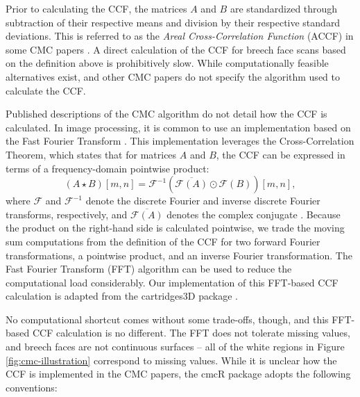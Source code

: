 \documentclass[11pt,]{isuthesis}
\begin{document}
Prior to calculating the CCF, the matrices \(A\) and \(B\) are standardized through subtraction of their respective means and division by their respective standard deviations.
This is referred to as the \emph{Areal Cross-Correlation Function} (ACCF) in some CMC papers \citep{ott_applying_2017}.
A direct calculation of the CCF for breech face scans based on the definition above is prohibitively slow.
While computationally feasible alternatives exist, \citet{song_proposed_2013} and other CMC papers do not specify the algorithm used to calculate the CCF.

Published descriptions of the CMC algorithm do not detail how the CCF is calculated.
In image processing, it is common to use an implementation based on the Fast Fourier Transform \citep{Brown1992}.
This implementation leverages the Cross-Correlation Theorem, which states that for matrices \(A\) and \(B\), the CCF can be expressed in terms of a frequency-domain pointwise product:
\[
(A \star B )[m,n]= \mathcal{F}^{-1}\left(\overline{\mathcal{F}(A)} \odot \mathcal{F}(B)\right)[m,n],
\]
where \(\mathcal{F}\) and \(\mathcal{F}^{-1}\) denote the discrete Fourier and inverse discrete Fourier transforms, respectively, and \(\overline{\mathcal{F}(A)}\) denotes the complex conjugate \citep{fft_brigham}.
Because the product on the right-hand side is calculated pointwise, we trade the moving sum computations from the definition of the CCF for two forward Fourier transformations, a pointwise product, and an inverse Fourier transformation.
The Fast Fourier Transform (FFT) algorithm can be used to reduce the computational load considerably.
Our implementation of this FFT-based CCF calculation is adapted from the cartridges3D package \citep{cartridges3D}.

No computational shortcut comes without some trade-offs, though, and this FFT-based CCF calculation is no different.
The FFT does not tolerate missing values, and breech faces are not continuous surfaces -- all of the white regions in Figure \ref{fig:cmc-illustration} correspond to missing values.
While it is unclear how the CCF is implemented in the CMC papers, the cmcR package adopts the following conventions:
\end{document}
